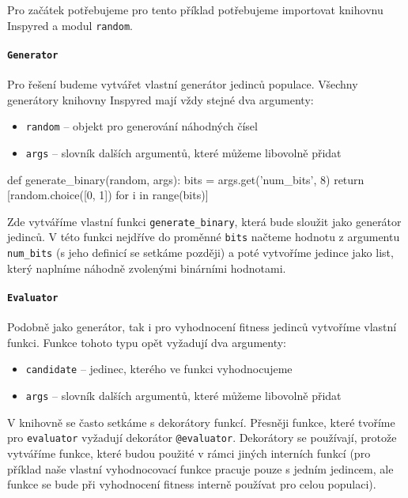 Pro začátek potřebujeme pro tento příklad potřebujeme importovat knihovnu
Inspyred a modul \texttt{random}.

\paragraph{\texttt{Generator}}
Pro řešení budeme vytvářet vlastní generátor jedinců populace. Všechny
generátory knihovny Inspyred mají vždy stejné dva argumenty:
\begin{itemize}
    \item \texttt{random} -- objekt pro generování náhodných čísel
    \item \texttt{args} -- slovník dalších argumentů, které můžeme libovolně
        přidat
\end{itemize}

\begin{code}
def generate_binary(random, args):
    bits = args.get('num_bits', 8)
    return [random.choice([0, 1]) for i in range(bits)]
\end{code}

Zde vytváříme vlastní funkci \texttt{generate\_binary}, která bude sloužit jako
generátor jedinců. V této funkci nejdříve do proměnné \texttt{bits} načteme
hodnotu z argumentu \texttt{num\_bits} (s jeho definicí se setkáme později) a
poté vytvoříme jedince jako list, který naplníme náhodně zvolenými binárními
hodnotami.

\paragraph{\texttt{Evaluator}}
Podobně jako generátor, tak i pro vyhodnocení fitness jedinců vytvoříme vlastní
funkci. Funkce tohoto typu opět vyžadují dva argumenty:
\begin{itemize}
    \item \texttt{candidate} -- jedinec, kterého ve funkci vyhodnocujeme
    \item \texttt{args} -- slovník dalších argumentů, které můžeme libovolně
        přidat
\end{itemize}

V knihovně se často setkáme s dekorátory funkcí. Přesněji funkce, které tvoříme
pro \texttt{evaluator} vyžadují dekorátor \texttt{@evaluator}. Dekorátory se
používají, protože vytváříme funkce, které budou použité v rámci jiných
interních funkcí (pro příklad naše vlastní vyhodnocovací funkce pracuje pouze s
jedním jedincem, ale funkce se bude při vyhodnocení fitness interně používat
pro celou populaci).

